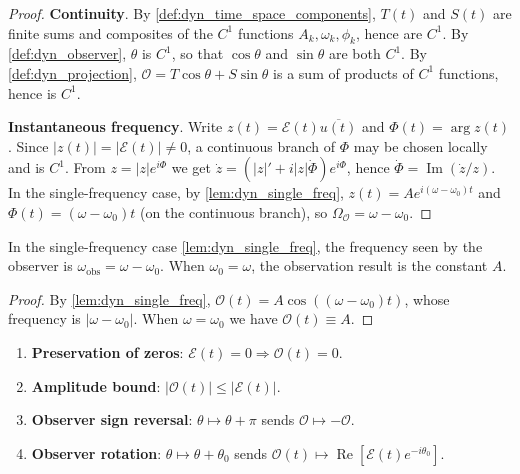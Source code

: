 \begin{proof}
\textbf{Continuity}. By \cref{def:dyn_time_space_components}, $T(t)$ and $S(t)$ are finite sums and composites of the $C^1$ functions $A_k,\omega_k,\phi_k$, hence are $C^1$. By \cref{def:dyn_observer}, $\theta$ is $C^1$, so that $\cos\theta$ and $\sin\theta$ are both $C^1$. By \cref{def:dyn_projection}, $\mathcal O=T\cos\theta+S\sin\theta$ is a sum of products of $C^1$ functions, hence is $C^1$.

\textbf{Instantaneous frequency}. Write $z(t)=\mathcal E(t)\overline{u(t)}$ and $\Phi(t)=\arg z(t)$. Since $|z(t)|=|\mathcal E(t)|\neq0$, a continuous branch of $\Phi$ may be chosen locally and is $C^1$. From $z=|z|e^{i\Phi}$ we get $\dot z=(|z|'+i|z|\dot\Phi)e^{i\Phi}$, hence $\dot\Phi=\operatorname{Im}(\dot z/z)$. In the single-frequency case, by \cref{lem:dyn_single_freq}, $z(t)=A e^{i(\omega-\omega_0)t}$ and $\Phi(t)=(\omega-\omega_0)t$ (on the continuous branch), so $\Omega_{\mathcal O}=\omega-\omega_0$.
\end{proof}

\begin{corollary}\label{cor:dyn_doppler}
In the single-frequency case \cref{lem:dyn_single_freq}, the frequency seen by the observer is $\omega_{\text{obs}}=\omega-\omega_0$. When $\omega_0=\omega$, the observation result is the constant $A$.
\end{corollary}

\begin{proof}
By \cref{lem:dyn_single_freq}, $\mathcal O(t)=A\cos((\omega-\omega_0)t)$, whose frequency is $|\omega-\omega_0|$. When $\omega=\omega_0$ we have $\mathcal O(t)\equiv A$.
\end{proof}

\begin{property}\label{prop:dyn_projection_properties}
\begin{enumerate}[label=(\roman*)]
    \item \textbf{Preservation of zeros}: $\mathcal E(t)=0\Rightarrow\mathcal O(t)=0$.
    \item \textbf{Amplitude bound}: $|\mathcal O(t)|\le|\mathcal E(t)|$.
    \item \textbf{Observer sign reversal}: $\theta\mapsto\theta+\pi$ sends $\mathcal O\mapsto-\mathcal O$.
    \item \textbf{Observer rotation}: $\theta\mapsto\theta+\theta_0$ sends $\mathcal O(t)\mapsto\operatorname{Re}[\mathcal E(t)e^{-i\theta_0}]$.
\end{enumerate}
\end{property}


